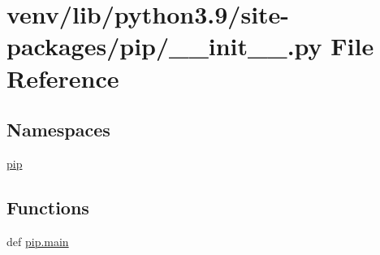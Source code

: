 \hypertarget{venv_2lib_2python3_89_2site-packages_2pip_2____init_____8py}{}\section{venv/lib/python3.9/site-\/packages/pip/\+\_\+\+\_\+init\+\_\+\+\_\+.py File Reference}
\label{venv_2lib_2python3_89_2site-packages_2pip_2____init_____8py}
\subsection*{Namespaces}
\begin{DoxyCompactItemize}
\item 
 \hyperlink{namespacepip}{pip}
\end{DoxyCompactItemize}
\subsection*{Functions}
\begin{DoxyCompactItemize}
\item 
def \hyperlink{namespacepip_ad49f7f8d9e43e00081ef2ee8501ecd99}{pip.\+main}
\end{DoxyCompactItemize}
